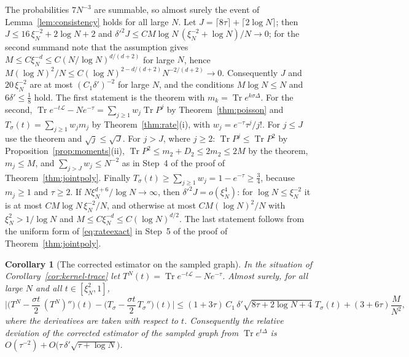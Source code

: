 \documentclass[11pt,a4paper]{article}
\makeatletter
\theoremstyle{stmt}
\newtheorem{corollary}[theorem]{Corollary}
\theoremstyle{defn}
\theoremstyle{rmk}
\renewenvironment{proof}[1][\proofname]{\par\pushQED{\qed}\normalfont\topsep6\p@\@plus6\p@\relax
  \trivlist\item[\hskip\labelsep{\sffamily\itshape\small #1.}]\ignorespaces}{\popQED\endtrivlist\@endpefalse}
\numberwithin{equation}{section}
\DeclareMathOperator{\Tr}{Tr}
\newcommand{\Lc}{\mathcal{L}}
\makeatother
\begin{document}
{\begin{proof}
The probabilities $7N^{-3}$ are summable, so almost surely the event of Lemma~\ref{lem:consistency} holds for all large $N$. Let $J=\lceil8\tau\rceil+\lceil2\log N\rceil$; then $J\le16\,\xi_N^{-2}+2\log N+2$ and $\delta'^2J\le CM\log N\,(\xi_N^{-2}+\log N)/N\to0$; for the second summand note that the assumption gives $M\le C\xi_N^{-d}\le C(N/\log N)^{d/(d+2)}$ for large $N$, hence $M(\log N)^2/N\le C(\log N)^{2-d/(d+2)}N^{-2/(d+2)}\to0$. Consequently $J$ and $20\,\xi_N^{-2}$ are at most $(C_1\delta')^{-2}$ for large $N$, and the conditions $M\log N\le N$ and $6\delta'\le\frac18$ hold. The first statement is the theorem with $m_k=\Tr e^{k\sigma\Delta}$. For the second, $\Tr e^{-t\Lc}-Ne^{-\tau}=\sum_{j\ge1}w_j\Tr P^j$ by Theorem~\ref{thm:poisson} and $T_\sigma(t)=\sum_{j\ge1}w_jm_j$ by Theorem~\ref{thm:rate}(i), with $w_j=e^{-\tau}\tau^j/j!$. For $j\le J$ use the theorem and $\sqrt j\le\sqrt J$. For $j>J$, where $j\ge2$: $\Tr P^j\le\Tr P^2$ by Proposition~\ref{prop:moments}(ii), $\Tr P^2\le m_2+D_2\le2m_2\le2M$ by the theorem, $m_j\le M$, and $\sum_{j>J}w_j\le N^{-2}$ as in Step~4 of the proof of Theorem~\ref{thm:jointpoly}. Finally $T_\sigma(t)\ge\sum_{j\ge1}w_j=1-e^{-\tau}\ge\frac34$, because $m_j\ge1$ and $\tau\ge2$. If $N\xi_N^{d+6}/\log N\to\infty$, then $\delta'^2J=o(\xi_N^4)$: for $\log N\le\xi_N^{-2}$ it is at most $CM\log N\,\xi_N^{-2}/N$, and otherwise at most $CM(\log N)^2/N$ with $\xi_N^2>1/\log N$ and $M\le C\xi_N^{-d}\le C(\log N)^{d/2}$. The last statement follows from the uniform form of \eqref{eq:rateexact} in Step~5 of the proof of Theorem~\ref{thm:jointpoly}.
\end{proof}

\begin{corollary}[The corrected estimator on the sampled graph]\label{cor:kernel-corrected}
In the situation of Corollary~\ref{cor:kernel-trace} let $T^N(t)=\Tr e^{-t\Lc}-Ne^{-\tau}$. Almost surely, for all large $N$ and all $t\in[\xi_N^2,1]$,
\[
\Big|\Big(T^N-\frac{\sigma t}2\,(T^N)''\Big)(t)-\Big(T_\sigma-\frac{\sigma t}2\,T_\sigma''\Big)(t)\Big|\le(1+3\tau)\,C_1\,\delta'\sqrt{8\tau+2\log N+4}\;T_\sigma(t)+(3+6\tau)\frac M{N^2},
\]
where the derivatives are taken with respect to $t$. Consequently the relative deviation of the corrected estimator of the sampled graph from $\Tr e^{t\Delta}$ is $O(\tau^{-2})+O\big(\tau\,\delta'\sqrt{\tau+\log N}\big)$.
\end{corollary}

}
\end{document}
